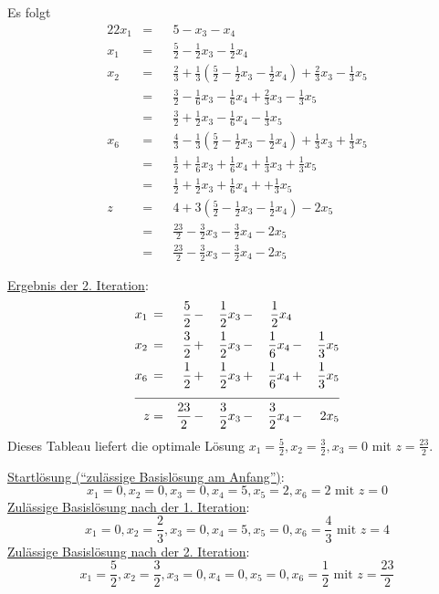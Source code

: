 \documentclass[10pt,a4paper,oneside,ngerman,numbers=noenddot]{scrartcl}
\begin{document}
		Es folgt
		\begin{alignat*}{2}
			2x_{1} &=&& 5 - x_{3} - x_{4} \\
			x_{1} &=&& \frac{5}{2} - \frac{1}{2}x_{3} - \frac{1}{2}x_{4} \\
			x_{2} &=&& \frac{2}{3} + \frac{1}{3}\left(\frac{5}{2} - \frac{1}{2}x_{3} - \frac{1}{2}x_{4}\right) + \frac{2}{3}x_{3} - \frac{1}{3}x_{5} \\
			&=&& \frac{3}{2} - \frac{1}{6}x_{3} - \frac{1}{6}x_{4} + \frac{2}{3}x_{3} - \frac{1}{3}x_{5} \\
			&=&& \frac{3}{2} + \frac{1}{2}x_{3} - \frac{1}{6}x_{4} - \frac{1}{3}x_{5} \\
			x_{6} &=&& \frac{4}{3} - \frac{1}{3}\left(\frac{5}{2} - \frac{1}{2}x_{3} - \frac{1}{2}x_{4}\right) + \frac{1}{3}x_{3} + \frac{1}{3}x_{5} \\
			&=&& \frac{1}{2} + \frac{1}{6}x_{3} + \frac{1}{6}x_{4} + \frac{1}{3}x_{3} + \frac{1}{3}x_{5} \\
			&=&& \frac{1}{2} + \frac{1}{2}x_{3} + \frac{1}{6}x_{4} + + \frac{1}{3}x_{5} \\
			z &=&& 4 + 3\left(\frac{5}{2} - \frac{1}{2}x_{3} - \frac{1}{2}x_{4}\right) - 2x_{5} \\
			&=&& \frac{23}{2} - \frac{3}{2}x_{3} - \frac{3}{2}x_{4} - 2x_{5} \\
			&=&& \frac{23}{2} - \frac{3}{2}x_{3} - \frac{3}{2}x_{4} - 2x_{5}
		\end{alignat*}
		
		\underline{Ergebnis der 2. Iteration}:
		\begin{alignat*}{5}
			x_{1} \,&=&\, \frac{5}{2} \,&-&\, \frac{1}{2}x_{3} \,&-&\, \frac{1}{2}x_{4} && \\
			x_{2} \,&=&\, \frac{3}{2} \,&+&\, \frac{1}{2}x_{3} \,&-&\, \frac{1}{6}x_{4} \,&-&\, \frac{1}{3}x_{5} \\
			x_{6} \,&=&\, \frac{1}{2} \,&+&\, \frac{1}{2}x_{3} \,&+&\, \frac{1}{6}x_{4} \,&+&\, \frac{1}{3}x_{5} \\ \cline{1 - 9}
			z &=& \frac{23}{2} \,&-&\, \frac{3}{2}x_{3} \,&-&\, \frac{3}{2}x_{4} \,&-&\, 2x_{5}
		\end{alignat*}
		Dieses Tableau liefert die optimale Lösung $x_{1} = \frac{5}{2}, x_{2} = \frac{3}{2}, x_{3} = 0$ mit $z = \frac{23}{2}$.
		
		\underline{Startlösung ("`zulässige Basislösung am Anfang"')}:
		\[
			x_{1} = 0, x_{2} = 0, x_{3} = 0, x_{4} = 5, x_{5} = 2, x_{6} = 2  \text{ mit } z = 0
		\]
		\underline{Zulässige Basislösung nach der 1. Iteration}:
		\[
			x_{1} = 0, x_{2} = \frac{2}{3}, x_{3} = 0, x_{4} = 5, x_{5} = 0, x_{6} = \frac{4}{3} \text{ mit } z = 4
		\]
		\underline{Zulässige Basislösung nach der 2. Iteration}:
		\[
			x_{1} = \frac{5}{2}, x_{2} = \frac{3}{2}, x_{3} = 0, x_{4} = 0, x_{5} = 0, x_{6} = \frac{1}{2} \text{ mit } z = \frac{23}{2}
		\]
	\subsection{} %
\section{} %
\end{document}
